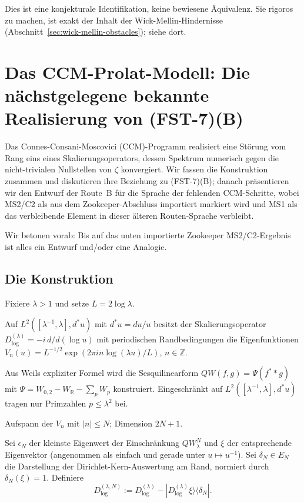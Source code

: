 \documentclass[11pt,a4paper]{article}
\theoremstyle{plain}
\theoremstyle{definition}
\newcommand{\R}{\mathbb{R}}
\newcommand{\Z}{\mathbb{Z}}
\begin{document}
Dies ist eine konjekturale Identifikation, keine bewiesene Äquivalenz.
Sie rigoros zu machen, ist exakt der Inhalt der Wick-Mellin-Hindernisse
(Abschnitt~\ref{sec:wick-mellin-obstacles}); siehe dort.

\section{Das CCM-Prolat-Modell: Die nächstgelegene bekannte Realisierung von (FST-7)(B)}
\label{sec:ccm-prolate}

Das Connes-Consani-Moscovici (CCM)-Programm
\cite{ConnesConsani2023,ConnesMoscovici2022,ConnesConsaniMoscovici2025}
realisiert eine Störung vom Rang eins eines Skalierungsoperators,
dessen Spektrum numerisch gegen die nicht-trivialen Nullstellen von $\zeta$
konvergiert. Wir fassen die Konstruktion zusammen und diskutieren ihre
Beziehung zu (FST-7)(B); danach präsentieren wir den Entwurf der Route~B
für die Sprache der fehlenden CCM-Schritte, wobei MS2/C2 als aus dem
Zookeeper-Abschluss importiert markiert wird und MS1 als das
verbleibende Element in dieser älteren Routen-Sprache verbleibt.

Wir betonen vorab: Bis auf das unten importierte Zookeeper MS2/C2-Ergebnis
ist alles ein Entwurf und/oder eine Analogie.

\subsection{Die Konstruktion}
\label{sec:ccm-construction}

Fixiere $\lambda > 1$ und setze $L = 2 \log\lambda$.

\begin{description}[leftmargin=*,style=nextline]
\item[\textbf{Skalierungs-Tripel.}] Auf $L^2([\lambda^{-1}, \lambda],
  d^\ast u)$ mit $d^\ast u = du/u$ besitzt der Skalierungsoperator
  $D^{(\lambda)}_{\log} = -i\,d/d(\log u)$ mit periodischen Randbedingungen
  die Eigenfunktionen $V_n(u) = L^{-1/2}\exp(2\pi i n \log(\lambda u)/L)$, $n \in \Z$.
\item[\textbf{Weil-Quadratische Form.}] Aus Weils expliziter Formel
  wird die Sesquilinearform $QW(f,g) = \Psi(f^\ast * g)$ mit $\Psi =
  W_{0,2} - W_\R - \sum_p W_p$ konstruiert. Eingeschränkt auf
  $L^2([\lambda^{-1}, \lambda], d^\ast u)$ tragen nur Primzahlen $p \leq
  \lambda^2$ bei.
\item[\textbf{Test-Unterraum $E_N$.}] Aufspann der $V_n$ mit $|n|
  \leq N$; Dimension $2N+1$.
\item[\textbf{Störung vom Rang eins.}] Sei $\epsilon_N$ der
  kleinste Eigenwert der Einschränkung $QW_\lambda^N$ und $\xi$
  der entsprechende Eigenvektor (angenommen als einfach und gerade unter $u
  \mapsto u^{-1}$). Sei $\delta_N \in E_N$ die Darstellung der Dirichlet-Kern-Auswertung
  am Rand, normiert durch $\delta_N(\xi) = 1$. Definiere
  \[
     D^{(\lambda,N)}_{\log} := D^{(\lambda)}_{\log}
       - |D^{(\lambda)}_{\log}\xi\rangle\langle\delta_N|.
  \]
\end{description}
\end{document}

